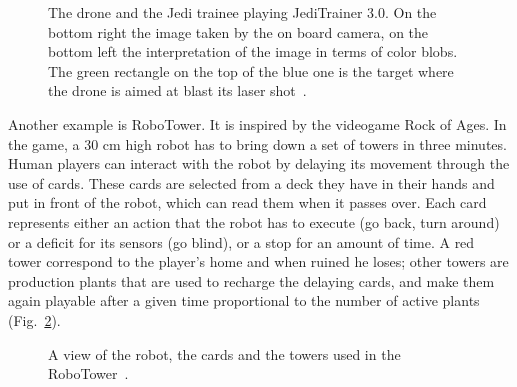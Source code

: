 \begin{figure}[h]
  \centering  
  \caption{The drone and the Jedi trainee playing JediTrainer 3.0. On the bottom right the image taken by the on board camera, on the bottom left the interpretation of the image in terms of color blobs. The green rectangle on the top of the blue one is the target where the drone is aimed at blast its laser shot~\citep{bonarini_timing_2014}.}
  \label{fig:jedi_trainer}
\end{figure}

Another example is RoboTower. It is inspired by the videogame Rock of Ages. In the game, a 30 cm high robot has to bring down a set of towers in three minutes. Human players can interact with the robot by delaying its movement through the use of cards. These cards are selected from a deck they have in their hands and put in front of the robot, which can read them when it passes over. Each card represents either an action that the robot has to execute (go back, turn around) or a deficit for its sensors (go blind), or a stop for an amount of time. A red tower correspond to the player's home and when ruined he loses; other towers are production plants that are used to recharge the delaying cards, and make them again playable after a given time proportional to the number of active plants (Fig.~\ref{fig:robo_tower}).

\begin{figure}[htp]
  \centering  
  \caption{A view of the robot, the cards and the towers used in the RoboTower~\citep{bonarini_timing_2014}.}
    \label{fig:robo_tower}
\end{figure}


